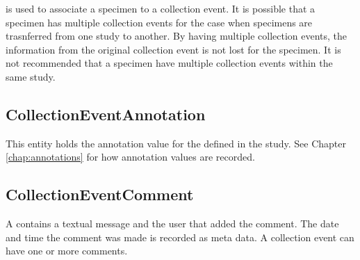  is used to associate a specimen to a
collection event. It is possible that a specimen has multiple collection events
for the case when specimens are trasnferred from one study to another. By
having multiple collection events, the information from the original collection
event is not lost for the specimen. It is not recommended that a specimen have
multiple collection events within the same study.

\subsection*{CollectionEventAnnotation}
This entity holds the annotation value for the
 defined in the study. See Chapter
\ref{chap:annotations} for how annotation values are recorded.

\subsection*{CollectionEventComment}
A  contains a textual message and the user
that added the comment. The date and time the comment was made is recorded as
meta data. A collection event can have one or more comments.




